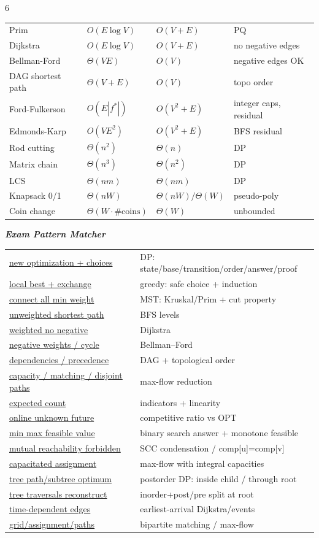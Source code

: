 \documentclass[a4paper,landscape]{article}
\renewcommand{\textbf}[1]{\underline{#1}}
\newcommand{\subsectionsize}{\fontsize{3.92}{4.02}\selectfont}
\newcommand{\proofbanktitle}[1]{%
  \par\vspace{0pt}%
  {\subsectionsize\bfseries\itshape\color{rustKeyword} #1}\par%
  \vspace{0pt}%
}
\begin{document}
\begin{multicols*}{6}
{\begin{tabular}{@{}llll@{}}
Prim & $O(E\log V)$ & $O(V+E)$ & PQ \\
Dijkstra & $O(E\log V)$ & $O(V+E)$ & no negative edges \\
Bellman-Ford & $\Theta(VE)$ & $O(V)$ & negative edges OK \\
DAG shortest path & $\Theta(V+E)$ & $O(V)$ & topo order \\
Ford-Fulkerson & $O(E|f^*|)$ & $O(V^2{+}E)$ & integer caps, residual \\
Edmonds-Karp & $O(VE^2)$ & $O(V^2{+}E)$ & BFS residual \\
Rod cutting & $\Theta(n^2)$ & $\Theta(n)$ & DP \\
Matrix chain & $\Theta(n^3)$ & $\Theta(n^2)$ & DP \\
LCS & $\Theta(nm)$ & $\Theta(nm)$ & DP \\
Knapsack 0/1 & $\Theta(nW)$ & $\Theta(nW)/\allowbreak \Theta(W)$ & pseudo-poly \\
\hline
Coin change & $\Theta(W\cdot \#\text{coins})$ & $\Theta(W)$ & unbounded \\
\hline
\end{tabular}%
}
\proofbanktitle{Exam Pattern Matcher}
\begin{tabular}{@{}ll@{}}
\textbf{new optimization + choices} & DP: state/base/transition/order/answer/proof \\
\textbf{local best + exchange} & greedy: safe choice + induction \\
\textbf{connect all min weight} & MST: Kruskal/Prim + cut property \\
\textbf{unweighted shortest path} & BFS levels \\
\textbf{weighted no negative} & Dijkstra \\
\textbf{negative weights / cycle} & Bellman--Ford \\
\textbf{dependencies / precedence} & DAG + topological order \\
\textbf{capacity / matching / disjoint paths} & max-flow reduction \\
\textbf{expected count} & indicators + linearity \\
\textbf{online unknown future} & competitive ratio vs OPT \\
\textbf{min max feasible value} & binary search answer + monotone feasible \\
\textbf{mutual reachability forbidden} & SCC condensation / comp[u]=comp[v] \\
\textbf{capacitated assignment} & max-flow with integral capacities \\
\textbf{tree path/subtree optimum} & postorder DP: inside child / through root \\
\textbf{tree traversals reconstruct} & inorder+post/pre split at root \\
\textbf{time-dependent edges} & earliest-arrival Dijkstra/events \\
\textbf{grid/assignment/paths} & bipartite matching / max-flow
\end{tabular}


\end{multicols*}
\end{document}
